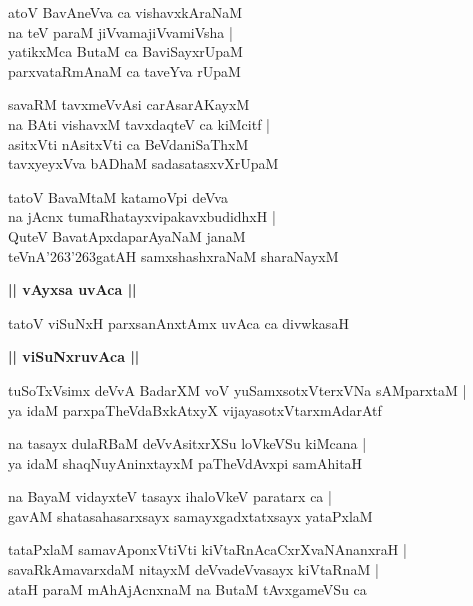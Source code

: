 \documentclass[twoside,12pt,openright]{book}
\def\S{\char'263}
\newcounter{shloka}[chapter]
\def\uvaca#1{\centerline{{\large\textbf{#1}}}}
\begin{document}
\begin{shloka}%
atoV BavAneVva ca vishavxkAraNaM \\
na teV paraM jiVvamajiVvamiVsha |\\
yatikxMca ButaM ca BaviSayxrUpaM \\
parxvataRmAnaM ca taveYva rUpaM 
\end{shloka}

\begin{shloka}%
savaRM tavxmeVvAsi carAsarAKayxM \\
na BAti vishavxM tavxdaqteV ca kiMcitf |\\
asitxVti nAsitxVti ca BeVdaniSaThxM \\
tavxyeyxVva bADhaM sadasatasxvXrUpaM 
\end{shloka}

\begin{shloka}%
tatoV BavaMtaM katamoVpi deVva \\
na jAcnx tumaRhatayxvipakavxbudidhxH |\\
QuteV BavatApxdaparAyaNaM janaM \\
teVnA\S\S gatAH samxshashxraNaM sharaNayxM 
\end{shloka}

\uvaca{|| vAyxsa uvAca ||}

\begin{shloka}%
tatoV viSuNxH parxsanAnxtAmx uvAca ca divwkasaH 
\end{shloka}

\uvaca{|| viSuNxruvAca ||}

\begin{shloka}%
tuSoTxVsimx deVvA BadarXM voV yuSamxsotxVterxVNa sAMparxtaM |\\
ya idaM parxpaTheVdaBxkAtxyX vijayasotxVtarxmAdarAtf
\end{shloka}

\begin{shloka}%
na tasayx dulaRBaM deVvAsitxrXSu loVkeVSu kiMcana |\\
ya idaM shaqNuyAninxtayxM paTheVdAvxpi samAhitaH 
\end{shloka}

\begin{shloka}%
na BayaM vidayxteV tasayx ihaloVkeV paratarx ca |\\
gavAM shatasahasarxsayx samayxgadxtatxsayx yataPxlaM 
\end{shloka}

\begin{shloka}%
tataPxlaM samavAponxVtiVti kiVtaRnAcaCxrXvaNAnanxraH |\\
savaRkAmavarxdaM nitayxM deVvadeVvasayx kiVtaRnaM |\\
ataH paraM mAhAjAcnxnaM na ButaM tAvxgameVSu ca 
\end{shloka}
\end{document}
